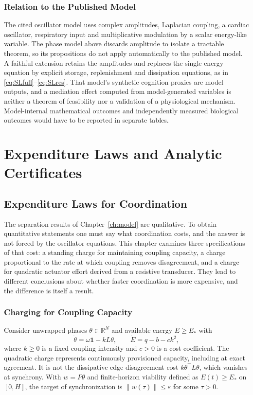 \documentclass[11pt,notitlepage]{report}
\theoremstyle{definition}
\theoremstyle{remark}
\newcommand{\R}{\mathbb R}
\newcommand{\one}{\mathbf 1}
\begin{document}
\section{Relation to the Published Model}
The cited oscillator model \cite{lombardo2026} uses complex amplitudes, Laplacian coupling, a cardiac oscillator, respiratory input and multiplicative modulation by a scalar energy-like variable. The phase model above discards amplitude to isolate a tractable theorem, so its propositions do not apply automatically to the published model. A faithful extension retains the amplitudes and replaces the single energy equation by explicit storage, replenishment and dissipation equations, as in \eqref{eq:SLfull}--\eqref{eq:SLres}. That model's synthetic cognition proxies are model outputs, and a mediation effect computed from model-generated variables is neither a theorem of feasibility nor a validation of a physiological mechanism. Model-internal mathematical outcomes and independently measured biological outcomes would have to be reported in separate tables.
\part{Expenditure Laws and Analytic Certificates}

\chapter{Expenditure Laws for Coordination}\label{ch:expenditure}

The separation results of Chapter~\ref{ch:model} are qualitative. To obtain quantitative statements one must say what coordination costs, and the answer is not forced by the oscillator equations. This chapter examines three specifications of that cost: a standing charge for maintaining coupling capacity, a charge proportional to the rate at which coupling removes disagreement, and a charge for quadratic actuator effort derived from a resistive transducer. They lead to different conclusions about whether faster coordination is more expensive, and the difference is itself a result.

\section{Charging for Coupling Capacity}
Consider unwrapped phases $\theta\in\R^N$ and available energy $E\ge E_*$ with
\begin{equation}\label{eq:capacity}
\dot\theta=\omega\one-kL\theta,\qquad \dot E=q-b-ck^2,
\end{equation}
where $k\ge0$ is a fixed coupling intensity and $c>0$ is a cost coefficient. The quadratic charge represents continuously provisioned capacity, including at exact agreement. It is not the dissipative edge-disagreement cost $k\theta^\top L\theta$, which vanishes at synchrony. With $w=P\theta$ and finite-horizon viability defined as $E(t)\ge E_*$ on $[0,H]$, the target of synchronization is $\|w(\tau)\|\le\varepsilon$ for some $\tau>0$.
\end{document}
